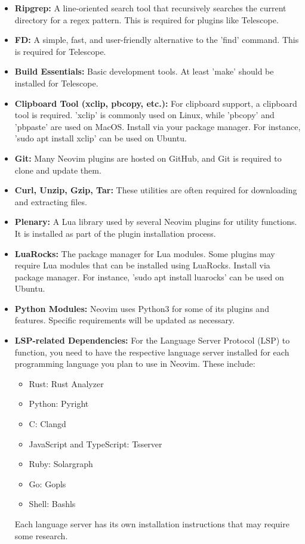 \documentclass{article}
\begin{document}
\begin{itemize}

\item \textbf{Ripgrep:} A line-oriented search tool that recursively searches 
the current directory for a regex pattern. This is required for plugins like 
Telescope.

\item \textbf{FD:} A simple, fast, and user-friendly alternative to the 'find'
command. This is required for Telescope.

\item \textbf{Build Essentials:} Basic development tools. At least 'make' 
should be installed for Telescope.

\item \textbf{Clipboard Tool (xclip, pbcopy, etc.):} For clipboard support, a 
clipboard tool is required. 'xclip' is commonly used on Linux, while 'pbcopy' 
and 'pbpaste' are used on MacOS. Install via your package manager. For instance, 
'sudo apt install xclip' can be used on Ubuntu.

\item \textbf{Git:} Many Neovim plugins are hosted on GitHub, and Git is 
required to clone and update them.

\item \textbf{Curl, Unzip, Gzip, Tar:} These utilities are often required for 
downloading and extracting files.

\item \textbf{Plenary:} A Lua library used by several Neovim plugins for 
utility functions. It is installed as part of the plugin installation process.

\item \textbf{LuaRocks:} The package manager for Lua modules. Some plugins may 
require Lua modules that can be installed using LuaRocks. Install via package 
manager. For instance, 'sudo apt install luarocks' can be used on Ubuntu.

\item \textbf{Python Modules:} Neovim uses Python3 for some of its plugins and 
features. Specific requirements will be updated as necessary. 

\item \textbf{LSP-related Dependencies:} For the Language Server Protocol (LSP) 
to function, you need to have the respective language server installed for each 
programming language you plan to use in Neovim. These include:
\begin{itemize}
\item Rust: Rust Analyzer
\item Python: Pyright
\item C: Clangd
\item JavaScript and TypeScript: Tsserver
\item Ruby: Solargraph
\item Go: Gopls
\item Shell: Bashls
\end{itemize}
Each language server has its own installation instructions that may require 
some research.

\end{itemize}
\end{document}
